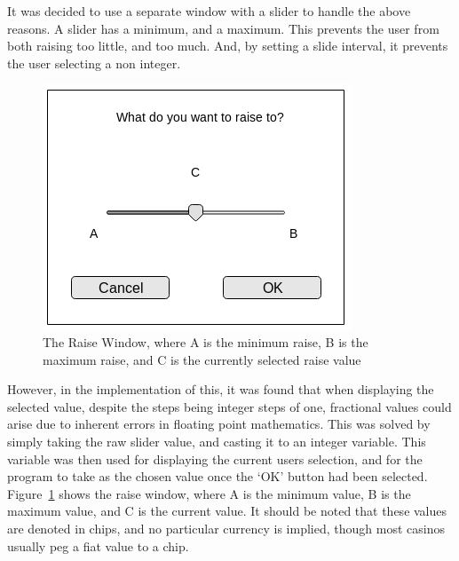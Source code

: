 It was decided to use a separate window with a slider to handle the above
reasons. A slider has a minimum, and a maximum. This prevents the user from
both raising too little, and too much. And, by setting a slide interval, it
prevents the user selecting a non integer.

\begin{figure}[h]
    \centering
    \includegraphics[width=0.5\linewidth]{../images/raisewindow.png}
    \caption{The Raise Window, where A is the minimum raise, B is the maximum
             raise, and C is the currently selected raise value}%
    \label{fig:raisewindow}
\end{figure}

However, in the implementation of this, it was found that when displaying
the selected value, despite the steps being integer steps of one, 
fractional values could arise due to inherent errors in floating point 
mathematics. This was solved by simply taking the raw slider value, and 
casting it to an integer variable. This variable was then used for displaying 
the current users selection, and for the program to take as the chosen value 
once the `OK' button had been selected. Figure~\ref{fig:raisewindow} shows the 
raise window, where A is the minimum value, B is the maximum value, and C is 
the current value. It should be noted that these values are denoted in chips,
and no particular currency is implied, though most casinos usually peg a
fiat value to a chip.

